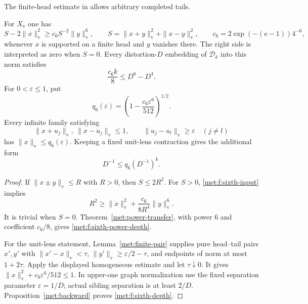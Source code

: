 The finite-head estimate in \cite[Theorem~7.4]{RecursivePotentials}
allows arbitrary completed tails.

\begin{proposition}\label{met:f:sixth}
For $X_{\mathrm v}$ one has
\begin{equation}\label{met:f:sixth-input}
 S-2\|x\|_{\mathrm v}^2
 \ge c_6S^{-2}\|y\|_{\mathrm v}^6,
 \qquad
 S=\|x+y\|_{\mathrm v}^2+\|x-y\|_{\mathrm v}^2,
 \qquad c_6=2\exp(-(\mathrm e-1))4^{-6},
\end{equation}
whenever $x$ is supported on a finite head and $y$ vanishes there.
The right side is interpreted as zero when $S=0$.
Every distortion-$D$ embedding of $\mathcal D_k$ into this norm satisfies
\begin{equation}\label{met:f:sixth-power-depth}
 \frac{c_6 k}{8}\le D^6-D^4.
\end{equation}
For $0<\varepsilon\le1$, put
\begin{equation}\label{met:f:sixth-q}
 q_6(\varepsilon)=
 \left(1-\frac{c_6\varepsilon^6}{512}\right)^{1/2}.
\end{equation}
Every infinite family satisfying
\[
 \|x+u_j\|_{\mathrm v},\ \|x-u_j\|_{\mathrm v}\le1,
 \qquad \|u_j-u_l\|_{\mathrm v}\ge\varepsilon\quad(j\ne l)
\]
has $\|x\|_{\mathrm v}\le q_6(\varepsilon)$.
Keeping a fixed unit-lens contraction gives the additional form
\begin{equation}\label{met:f:sixth-depth}
 D^{-1}\le q_6(D^{-1})^k.
\end{equation}
\end{proposition}

\begin{proof}
If $\|x\pm y\|_{\mathrm v}\le R$ with $R>0$, then $S\le2R^2$.
For $S>0$, \eqref{met:f:sixth-input} implies
\[
 R^2\ge\|x\|_{\mathrm v}^2+
             \frac{c_6}{8R^4}\|y\|_{\mathrm v}^6.
\]
It is trivial when $S=0$. Theorem~\ref{met:power-transfer}, with
power $6$ and coefficient $c_6/8$, gives
\eqref{met:f:sixth-power-depth}.

For the unit-lens statement, Lemma~\ref{met:finite-pair} supplies
pure head--tail pairs $x',y'$ with
$\|x'-x\|_{\mathrm v}<\tau$,
$\|y'\|_{\mathrm v}\ge\varepsilon/2-\tau$, and endpoints of
norm at most $1+2\tau$. Apply the displayed homogeneous estimate
and let $\tau\downarrow0$. It gives
$\|x\|_{\mathrm v}^2+c_6\varepsilon^6/512\le1$.
In upper-one graph normalization use the fixed separation parameter
$\varepsilon=1/D$; actual sibling separation is at least $2/D$.
Proposition~\ref{met:backward} proves \eqref{met:f:sixth-depth}.
\end{proof}

